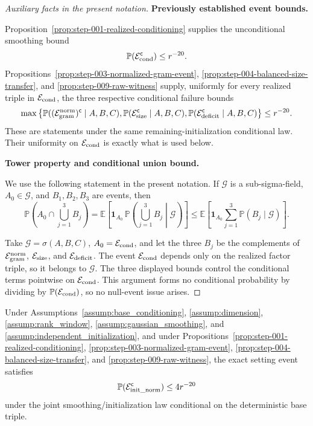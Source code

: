 \begin{proof}[Auxiliary facts in the present notation]


\medskip\noindent\textbf{Previously established event bounds.}\par

Proposition~\ref{prop:step-001-realized-conditioning} supplies the
unconditional smoothing bound
\[
  \mathbb P(\mathcal E_{\rm cond}^{\mathsf c})\le r^{-20}.
\]
Propositions~\ref{prop:step-003-normalized-gram-event},
\ref{prop:step-004-balanced-size-transfer}, and
\ref{prop:step-009-raw-witness} supply, uniformly for every realized triple
in \(\mathcal E_{\rm cond}\), the three respective conditional failure
bounds
\[
  \max\left\{
  \mathbb P((\mathcal E_{\rm gram}^{\rm norm})^{\mathsf c}\mid A,B,C),
  \mathbb P(\mathcal E_{\rm size}^{\mathsf c}\mid A,B,C),
  \mathbb P(\mathcal E_{\rm deficit}^{\mathsf c}\mid A,B,C)
  \right\}
  \le r^{-20}.
\]
These are statements under the same remaining-initialization conditional law.
Their uniformity on \(\mathcal E_{\rm cond}\) is exactly what is used below.


\medskip\noindent\textbf{Tower property and conditional union bound.}\par

We use the following statement in the present notation. If \(\mathcal G\) is a sub-sigma-field,
\(A_0\in\mathcal G\), and \(B_1,B_2,B_3\) are events, then
\[
  \mathbb P\!\left(A_0\cap\bigcup_{j=1}^3B_j\right)
  =\mathbb E\!\left[
    \mathbf 1_{A_0}\,\mathbb P\!\left(\bigcup_{j=1}^3B_j
      \middle|\mathcal G\right)
  \right]
  \le\mathbb E\!\left[
    \mathbf 1_{A_0}\sum_{j=1}^3\mathbb P(B_j\mid\mathcal G)
  \right].
\]

Take
\(\mathcal G=\sigma(A,B,C)\), \(A_0=\mathcal E_{\rm cond}\), and let the
three \(B_j\) be the complements of
\(\mathcal E_{\rm gram}^{\rm norm}\), \(\mathcal E_{\rm size}\), and
\(\mathcal E_{\rm deficit}\). The event \(\mathcal E_{\rm cond}\) depends
only on the realized factor triple, so it belongs to \(\mathcal G\). The
three displayed bounds control the conditional terms pointwise on
\(\mathcal E_{\rm cond}\). This argument forms no conditional probability by
dividing by \(\mathbb P(\mathcal E_{\rm cond})\), so no null-event issue
arises.

\end{proof}



\begin{proposition}
\label{prop:step-010-conditional-union}
Under Assumptions~\ref{assump:base_conditioning},
\ref{assump:dimension}, \ref{assump:rank_window},
\ref{assump:gaussian_smoothing}, and
\ref{assump:independent_initialization}, and under
Propositions~\ref{prop:step-001-realized-conditioning},
\ref{prop:step-003-normalized-gram-event},
\ref{prop:step-004-balanced-size-transfer}, and
\ref{prop:step-009-raw-witness}, the exact setting event satisfies
\[
  \mathbb P(\mathcal E_{\rm init\_norm}^{\mathsf c})\le4r^{-20}
\]
under the joint smoothing/initialization law conditional on the deterministic
base triple.

\end{proposition}

